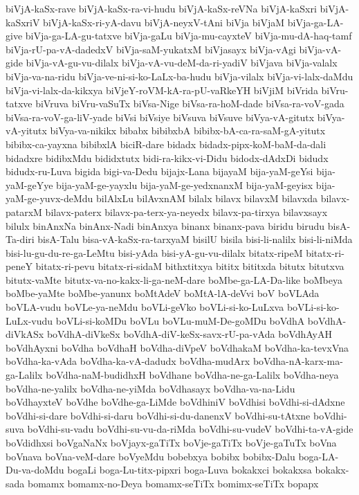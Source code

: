 {biVjA-kaSx-rave
biVjA-kaSx-ra-vi-hudu
biVjA-kaSx-reVNa
biVjA-kaSxri
biVjA-kaSxriV
biVjA-kaSx-ri-yA-davu
biVjA-neyxV-tAni
biVja
biVjaM
biVja-ga-LA-give
biVja-ga-LA-gu-tatxve
biVja-gaLu
biVja-mu-cayxteV
biVja-mu-dA-haq-tamf
biVja-rU-pa-vA-dadedxV
biVja-saM-yukatxM
biVjasayx
biVja-vAgi
biVja-vA-gide
biVja-vA-gu-vu-dilalx
biVja-vA-vu-deM-da-ri-yadiV
biVjava
biVja-valalx
biVja-va-na-ridu
biVja-ve-ni-si-ko-LaLx-ba-hudu
biVja-vilalx
biVja-vi-lalx-daMdu
biVja-vi-lalx-da-kikxya
biVjeY-roVM-kA-ra-pU-vaRkeYH
biVjiM
biVrida
biVru-tatxve
biVruva
biVru-vaSuTx
biVsa-Nige
biVsa-ra-hoM-dade
biVsa-ra-voV-gada
biVsa-ra-voV-ga-liV-yade
biVsi
biVsiye
biVsuva
biVsuve
biVya-vA-gitutx
biVya-vA-yitutx
biVya-va-nikikx
bibabx
bibibxbA
bibibx-bA-ca-ra-saM-gA-yitutx
bibibx-ca-yayxna
bibibxlA
biciR-dare
bidadx
bidadx-pipx-koM-baM-da-dali
bidadxre
bidibxMdu
bididxtutx
bidi-ra-kikx-vi-Didu
bidodx-dAdxDi
bidudx
bidudx-ru-Luva
bigida
bigi-va-Dedu
bijajx-Lana
bijayaM
bija-yaM-geYsi
bija-yaM-geYye
bija-yaM-ge-yayxlu
bija-yaM-ge-yedxnanxM
bija-yaM-geyisx
bija-yaM-ge-yuvx-deMdu
bilAlxLu
bilAvxnAM
bilalx
bilavx
bilavxM
bilavxda
bilavx-patarxM
bilavx-paterx
bilavx-pa-terx-ya-neyedx
bilavx-pa-tirxya
bilavxsayx
bilulx
binAnxNa
binAnx-Nadi
binAnxya
binanx
binanx-pava
biridu
birudu
bisA-Ta-diri
bisA-Talu
bisa-vA-kaSx-ra-tarxyaM
bisilU
bisila
bisi-li-nalilx
bisi-li-niMda
bisi-lu-gu-du-re-ga-LeMtu
bisi-yAda
bisi-yA-gu-vu-dilalx
bitatx-ripeM
bitatx-ri-peneY
bitatx-ri-pevu
bitatx-ri-sidaM
bithxtitxya
bititx
bititxda
bitutx
bitutxva
bitutx-vaMte
bitutx-va-no-kakx-li-ga-neM-dare
boMbe-ga-LA-Da-like
boMbeya
boMbe-yaMte
boMbe-yanunx
boMtAdeV
boMtA-lA-deVvi
boV
boVLAda
boVLA-vudu
boVLe-ya-neMdu
boVLi-geVko
boVLi-si-ko-LuLxva
boVLi-si-ko-LuLx-vudu
boVLi-si-koMDu
boVLu
boVLu-muM-De-goMDu
boVdhA
boVdhA-diVkASx
boVdhA-diVkeSx
boVdhA-diV-keSx-savx-rU-pa-vAda
boVdhAyAH
boVdhAyxni
boVdha
boVdhaH
boVdha-diVpeV
boVdhakaM
boVdha-ka-tevxVna
boVdha-ka-vAda
boVdha-ka-vA-dadudx
boVdha-mudArx
boVdha-nA-karx-ma-ga-Lalilx
boVdha-naM-budidhxH
boVdhane
boVdha-ne-ga-Lalilx
boVdha-neya
boVdha-ne-yalilx
boVdha-ne-yiMda
boVdhasayx
boVdha-va-na-Lidu
boVdhayxteV
boVdhe
boVdhe-ga-LiMde
boVdhiniV
boVdhisi
boVdhi-si-dAdxne
boVdhi-si-dare
boVdhi-si-daru
boVdhi-si-du-danenxV
boVdhi-su-tAtxne
boVdhi-suva
boVdhi-su-vadu
boVdhi-su-vu-da-riMda
boVdhi-su-vudeV
boVdhi-ta-vA-gide
boVdidhxsi
boVgaNaNx
boVjayx-gaTiTx
boVje-gaTiTx
boVje-gaTuTx
boVna
boVnava
boVna-veM-dare
boVyeMdu
bobebxya
bobibx
bobibx-Dalu
boga-LA-Du-va-doMdu
bogaLi
boga-Lu-titx-pipxri
boga-Luva
bokakxci
bokakxsa
bokakx-sada
bomamx
bomamx-no-Deya
bomamx-seTiTx
bomimx-seTiTx
bopapx
}
